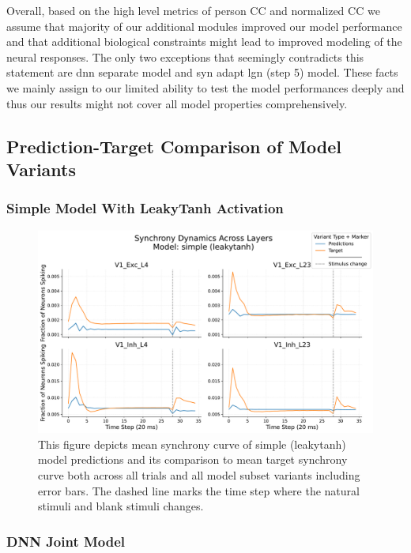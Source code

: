 Overall, based on the high level metrics of person CC and normalized CC we assume that majority of our additional modules improved our model performance and that additional biological constraints might lead to improved modeling of the neural responses. The only two exceptions that seemingly contradicts this statement are dnn separate model and syn adapt lgn (step 5) model. These facts we mainly assign to our limited ability to test the model performances deeply and thus our results might not cover all model properties comprehensively.

\subsection{Prediction-Target Comparison of Model Variants}
\label{subsec:prediction_target_comparison_variants}


\subsubsection{Simple Model With LeakyTanh Activation}
\label{{subsubsec:simpl_leakytanh_eval}}
\begin{figure}
    \centering
    \includegraphics[width=\linewidth]{img/plots/separate_model_synchrony_curve_simple_evaluation_new.pdf}
    \caption{This figure depicts mean synchrony curve of simple (leakytanh) model predictions and its comparison to mean target synchrony curve both across all trials and all model subset variants including error bars. The dashed line marks the time step where the natural stimuli and blank stimuli changes.}
    \label{fig:synchrony_curve_simple_leaky_tanh}
\end{figure}

\subsubsection{DNN Joint Model}
\label{{subsubsec:dnn_joint_eval}}

